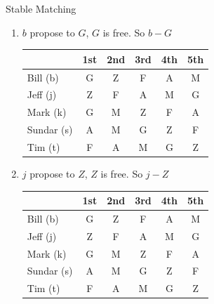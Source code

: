 \documentclass{article}
\numberwithin{table}{section}
\numberwithin{figure}{section}
\begin{document}
\begin{section}{Stable Matching}
\begin{enumerate} [(A)]
\begin{enumerate}[(1)]
            \begin{tcolorbox}[breakable]
                \begin{enumerate}[(1)]
                    \item $b$ propose to $G$, $G$ is free. So $b-G$
                    \begin{table}[H]
                        \centering
                        \begin{tabular}{|m{2.5cm}|*{5}{c|}}
                            \hline
                            & 1st & 2nd & 3rd & 4th & 5th \\
                            \hline
                            Bill (b)        & {\color{red} G} & Z & F & A & M \\
                            Jeff (j)        & Z & F & A & M & G \\
                            Mark (k)        & G & M & Z & F & A \\
                            Sundar (s)      & A & M & G & Z & F \\
                            Tim (t)         & F & A & M & G & Z \\
                            \hline                            
                        \end{tabular}
                    \end{table}

                    \item $j$ propose to $Z$, $Z$ is free. So $j-Z$
                    \begin{table}[H]
                        \centering
                        \begin{tabular}{|m{2.5cm}|*{5}{c|}}
                            \hline
                            & 1st & 2nd & 3rd & 4th & 5th \\
                            \hline
                            Bill (b)        & {\color{red} G} & Z & F & A & M \\
                            Jeff (j)        & {\color{red} Z} & F & A & M & G \\
                            Mark (k)        & G & M & Z & F & A \\
                            Sundar (s)      & A & M & G & Z & F \\
                            Tim (t)         & F & A & M & G & Z \\
                            \hline                            
                        \end{tabular}
                    \end{table}


\end{enumerate}
\end{tcolorbox}
\end{enumerate}
\end{enumerate}
\end{section}
\end{document}
